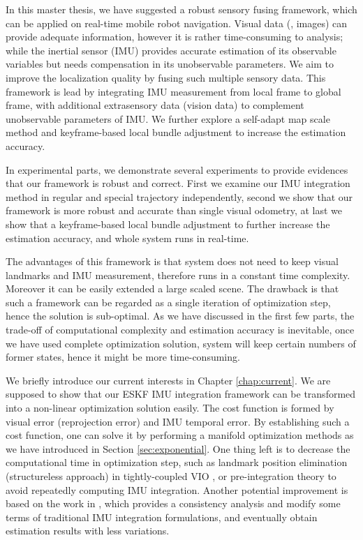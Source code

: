 
In this master thesis, we have suggested a robust sensory fusing framework, which can be applied on real-time mobile robot navigation. Visual data (\eg, images) can provide adequate information, however it is rather time-consuming to analysis; while the inertial sensor (IMU) provides accurate estimation of its observable variables but needs compensation in its unobservable parameters. We aim to improve the localization quality by fusing such multiple sensory data. This framework is lead by integrating IMU measurement from local frame to global frame, with additional extrasensory data (vision data) to complement unobservable parameters of IMU. We further explore a self-adapt map scale method and keyframe-based local bundle adjustment to increase the estimation accuracy.

In experimental parts, we demonstrate several experiments to provide evidences that our framework is robust and correct. First we examine our IMU integration method in regular and special trajectory independently, second we show that our framework is more robust and accurate than single visual odometry, at last we show that a keyframe-based local bundle adjustment to further increase the estimation accuracy, and whole system runs in real-time.

The advantages of this framework is that system does not need to keep visual landmarks and IMU measurement, therefore runs in a constant time complexity. Moreover it can be easily extended a large scaled scene. The drawback is that such a framework can be regarded as a single iteration of optimization step, hence the solution is sub-optimal. As we have discussed in the first few parts, the trade-off of computational complexity and estimation accuracy is inevitable, once we have used complete optimization solution, system will keep certain numbers of former states, hence it might be more time-consuming.

We briefly introduce our current interests in Chapter \ref{chap:current}. We are supposed to show that our ESKF IMU integration framework can be transformed into a non-linear optimization solution easily. The cost function is formed by visual error (reprojection error) and IMU temporal error. By establishing such a cost function, one can solve it by performing a manifold optimization methods as we have introduced in Section \ref{sec:exponential}. One thing left is to decrease the computational time in optimization step, such as landmark position elimination (structureless approach) in tightly-coupled VIO \cite{mourikis2007multi, forster2015imu}, or pre-integration theory \cite{forster2015imu} to avoid repeatedly computing IMU integration. Another potential improvement is based on the work in \cite{hesch2014consistency}, which provides a consistency analysis and modify some terms of traditional IMU integration formulations, and eventually obtain estimation results with less variations.

